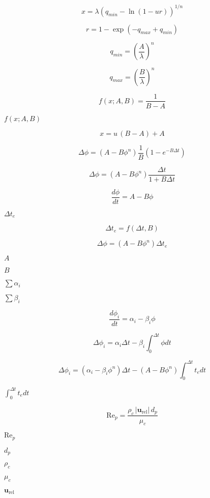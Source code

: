 \documentclass{article}
\begin{document}
\[
        x = \lambda \left( q_{min} - \ln (1 - u r) \right)^{1/n}
    \]
\pagebreak

\[
        r = 1 - \exp(-q_{max} + q_{min})
    \]
\pagebreak

\[
        q_{min} = \left(\frac{A}{\lambda}\right)^n
    \]
\pagebreak

\[
        q_{max} = \left(\frac{B}{\lambda}\right)^n
    \]
\pagebreak

\[
    f(x; A, B) = \frac{1}{B - A}
\]
\pagebreak

$      f(x; A, B)  $
\pagebreak

\[
        x = u \, (B - A) + A
    \]
\pagebreak

\[
    \Delta \phi = (A - B \phi^n) \frac{1}{B} (1 - e^{- B \Delta t})
\]
\pagebreak

\[
    \Delta \phi = (A - B \phi^n) \frac{\Delta t}{1 + B \Delta t}
\]
\pagebreak

\[
        \frac{d \phi}{d t} = A - B \phi
    \]
\pagebreak

$\Delta
t_e$
\pagebreak

\[
        \Delta t_e = f(\Delta t, B)
    \]
\pagebreak

\[
        \Delta \phi = (A - B \phi^n) \Delta t_e
    \]
\pagebreak

$A$
\pagebreak

$B$
\pagebreak

$\sum \alpha_i$
\pagebreak

$\sum \beta_i$
\pagebreak

\[
        \frac{d \phi_i}{d t} = \alpha_i - \beta_i \phi
    \]
\pagebreak

\[
        \Delta \phi_i = \alpha_i \Delta t -
        \beta_i \int_0^{\Delta t} \phi d t
    \]
\pagebreak

\[
        \Delta \phi_i = (\alpha_i - \beta_i \phi^n) \Delta t -
        (A - B \phi^n) \int_0^{\Delta t} t_e dt
    \]
\pagebreak

$\int_0^{\Delta t} t_e dt$
\pagebreak

\[
    \mathrm{Re}_p =
        \frac{\rho_c \, | \mathbf{u}_\mathrm{rel} | \, d_p}{\mu_c}
\]
\pagebreak

$        \mathrm{Re}_p  $
\pagebreak

$        d_p            $
\pagebreak

$        \rho_c         $
\pagebreak

$        \mu_c          $
\pagebreak

$        \mathbf{u}_\mathrm{rel} $
\pagebreak
\end{document}
